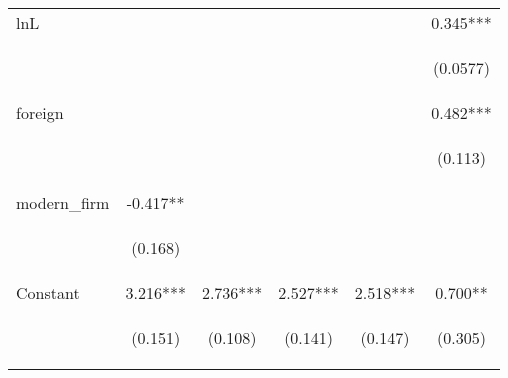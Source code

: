 \begin{center}
\begin{tabular}{lccccc}
lnL &  &  &  &  & 0.345*** \\
\vspace{4pt} & \begin{footnotesize}\end{footnotesize} & \begin{footnotesize}\end{footnotesize} & \begin{footnotesize}\end{footnotesize} & \begin{footnotesize}\end{footnotesize} & \begin{footnotesize}(0.0577)\end{footnotesize} \\
foreign &  &  &  &  & 0.482*** \\
\vspace{4pt} & \begin{footnotesize}\end{footnotesize} & \begin{footnotesize}\end{footnotesize} & \begin{footnotesize}\end{footnotesize} & \begin{footnotesize}\end{footnotesize} & \begin{footnotesize}(0.113)\end{footnotesize} \\
modern\_firm & -0.417** &  &  &  &  \\
\vspace{4pt} & \begin{footnotesize}(0.168)\end{footnotesize} & \begin{footnotesize}\end{footnotesize} & \begin{footnotesize}\end{footnotesize} & \begin{footnotesize}\end{footnotesize} & \begin{footnotesize}\end{footnotesize} \\
Constant & 3.216*** & 2.736*** & 2.527*** & 2.518*** & 0.700** \\
 & \begin{footnotesize}(0.151)\end{footnotesize} & \begin{footnotesize}(0.108)\end{footnotesize} & \begin{footnotesize}(0.141)\end{footnotesize} & \begin{footnotesize}(0.147)\end{footnotesize} & \begin{footnotesize}(0.305)\end{footnotesize} \\

\end{tabular}
\end{center}
